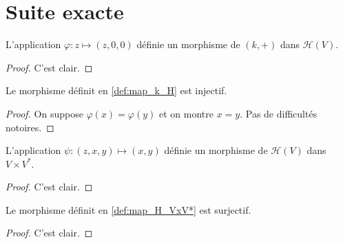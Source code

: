 \section{Suite exacte}

\begin{definition}
    \label{def:map_k_H}
    \leanok 

    L'application $\varphi:z\mapsto (z,0,0)$ définie un morphisme de 
    $(k,+)$ dans $\mathcal{H}(V)$.
    \begin{proof}
        \leanok
        C'est clair.
    \end{proof}
\end{definition}

\begin{proposition}
    \label{prop:inj_map_k_H}
    \leanok 

    Le morphisme définit en \ref{def:map_k_H} est injectif.
    \begin{proof}
        \leanok
        On suppose $\varphi(x)=\varphi(y)$ et on montre $x=y$. Pas de 
        difficultés notoires.
    \end{proof}
\end{proposition}

\begin{definition}
    \label{def:map_H_VxV*}
    \leanok 

    L'application $\psi:(z,x,y)\mapsto (x,y)$ définie un morphisme de 
    $\mathcal{H}(V)$ dans $V\times V^*$.
    \begin{proof}
        \leanok
        C'est clair.
    \end{proof}
\end{definition}

\begin{proposition}
    \label{prop:surj_map_H_VxV*}
    \leanok 

    Le morphisme définit en \ref{def:map_H_VxV*} est surjectif.
    \begin{proof}
        \leanok
        C'est clair.
    \end{proof}
\end{proposition}

